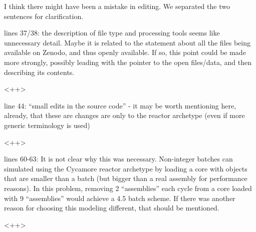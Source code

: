 \documentclass[answers,11pt]{exam}
\begin{document}
\begin{questions}
        \begin{solution}
        I think there might have been a mistake in editing.
        We separated the two sentences for clarification.
        \end{solution}

        \question lines 37/38: the description of file type and processing 
        tools seems like unnecessary detail.  Maybe it is related to the 
        statement about all the files being available on Zenodo, and thus 
        openly available.  If so, this point could be made more strongly, 
        possibly leading with the pointer to the open files/data, and then 
        describing its contents.

        \begin{solution}
        <++>
        \end{solution}

        \question line 44: ``small edits in the source code'' - it may be worth 
        mentioning here, already, that these are changes are only to the 
        reactor archetype (even if more generic terminology is used)

        \begin{solution}
        <++>
        \end{solution}

        \question lines 60-63: It is not clear why this was necessary. 
        Non-integer batches can simulated using the Cycamore reactor archetype 
        by loading a core with objects that are smaller than a batch (but 
        bigger than a real assembly for performance reasons).  In this problem, 
        removing 2 ``assemblies'' each cycle from a core loaded with 9 
        ``assemblies'' would achieve a 4.5 batch scheme.  If there was another 
        reason for choosing this modeling different, that should be mentioned.

        \begin{solution}
        <++>
        \end{solution}


\end{questions}
\end{document}
